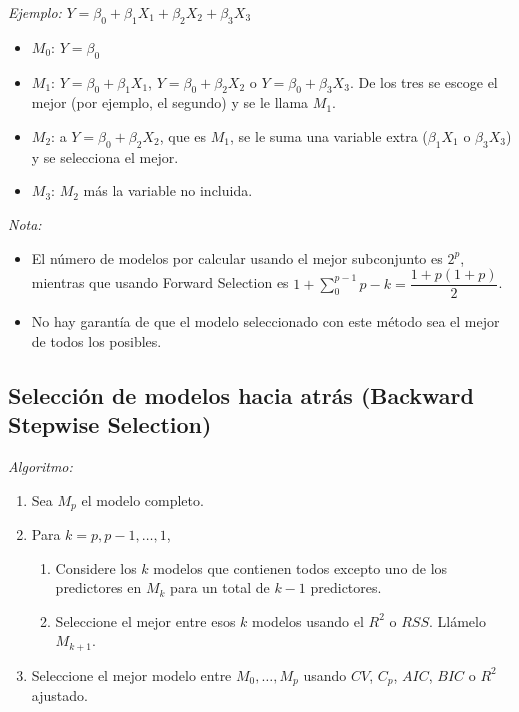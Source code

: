 \documentclass[
  12pt,
]{book}
\providecommand{\tightlist}{%
  \setlength{\itemsep}{0pt}\setlength{\parskip}{0pt}}
\theoremstyle{definition}
\theoremstyle{definition}
\theoremstyle{definition}
\theoremstyle{definition}
\theoremstyle{remark}
\begin{document}
\emph{Ejemplo:} \(Y=\beta_0+\beta_1X_1+\beta_2X_2+\beta_3X_3\)

\begin{itemize}
\item
  \(M_0\): \(Y = \beta_0\)
\item
  \(M_1\): \(Y = \beta_0+\beta_1X_1\), \(Y = \beta_0+\beta_2X_2\) o \(Y = \beta_0+\beta_3X_3\). De los tres se escoge el mejor (por ejemplo, el segundo) y se le llama \(M_1\).
\item
  \(M_2\): a \(Y = \beta_0+\beta_2X_2\), que es \(M_1\), se le suma una variable extra (\(\beta_1X_1\) o \(\beta_3X_3\)) y se selecciona el mejor.
\item
  \(M_3\): \(M_2\) más la variable no incluida.
\end{itemize}

\emph{Nota:}

\begin{itemize}
\item
  El número de modelos por calcular usando el mejor subconjunto es \(2^p\), mientras que usando Forward Selection es \(1+\displaystyle\sum_0^ {p-1} p-k = \dfrac{1+p(1+p)}2\).
\item
  No hay garantía de que el modelo seleccionado con este método sea el mejor de todos los posibles.
\end{itemize}

\hypertarget{selecciuxf3n-de-modelos-hacia-atruxe1s-backward-stepwise-selection}{%
\subsection{\texorpdfstring{Selección de modelos hacia atrás (\textbf{Backward Stepwise Selection})}{Selección de modelos hacia atrás (Backward Stepwise Selection)}}\label{selecciuxf3n-de-modelos-hacia-atruxe1s-backward-stepwise-selection}}

\emph{Algoritmo:}

\begin{enumerate}
\def\labelenumi{\arabic{enumi}.}
\tightlist
\item
  Sea \(M_p\) el modelo completo.
\item
  Para \(k=p,p-1,\dots,1\),

  \begin{enumerate}
  \def\labelenumii{\alph{enumii}.}
  \tightlist
  \item
    Considere los \(k\) modelos que contienen todos excepto uno de los predictores en \(M_k\) para un total de \(k-1\) predictores.
  \item
    Seleccione el mejor entre esos \(k\) modelos usando el \(R^2\) o \(RSS\). Llámelo \(M_{k+1}\).
  \end{enumerate}
\item
  Seleccione el mejor modelo entre \(M_0,\dots,M_p\) usando \(CV\), \(C_p\), \(AIC\), \(BIC\) o \(R^2\) ajustado.
\end{enumerate}
\end{document}
